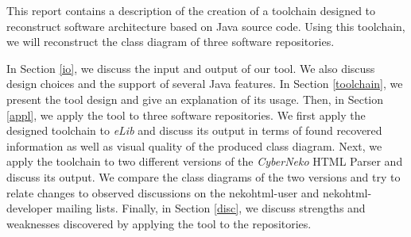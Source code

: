 This report contains a description of the creation of a toolchain designed to reconstruct software architecture based on Java source code.
Using this toolchain, we will reconstruct the class diagram of three software repositories. 

In Section \ref{io}, we discuss the input and output of our tool. We also discuss design choices and the support of several Java features.
In Section \ref{toolchain}, we present the tool design and give an explanation of its usage. Then, in Section \ref{appl}, we apply the tool to three software repositories. We first apply the designed toolchain to \textit{eLib} and discuss its output in terms of found recovered information as well as visual quality of the produced class diagram. Next, we apply the toolchain to two different versions of the \textit{CyberNeko} HTML Parser and discuss its output. We compare the class diagrams of the two versions and try to relate changes to observed discussions on the nekohtml-user and nekohtml-developer mailing lists. Finally, in Section \ref{disc}, we discuss strengths and weaknesses discovered by applying the tool to the repositories.

